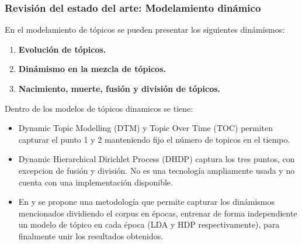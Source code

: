 \documentclass[
	spanish, %
	aspectratio=43, %
	hyperref={pdfencoding=auto,psdextra},
	xcolor={dvipsnames,table,usenames}
]{beamer}
\begin{document}
\begin{frame}
  
\frametitle{Revisión del estado del arte: Modelamiento dinámico}
En el modelamiento de tópicos se pueden presentar los siguientes dinámismos:

\begin{enumerate}
  \item \textbf{Evolución de tópicos.}
  \item \textbf{Dinámismo en la mezcla de tópicos.}
  \item \textbf{Nacimiento, muerte, fusión y división de tópicos.}
\end{enumerate}

Dentro de los modelos de tópicos dinamicos se tiene:
\begin{itemize}
  \item Dynamic Topic Modelling (DTM) y Topic Over Time (TOC)\cite{wang2006topics} permiten capturar el punto 1 y 2 manteniendo fijo el número de topicos en el tiempo.
  \item Dynamic Hierarchical Dirichlet Process (DHDP)\cite{ahmed2012timeline} captura los tres puntos, con excepcion de fusión y división. No es una tecnología ampliamente usada y no cuenta con una implementación disponible.\\
  \item En \cite{wilson2011tracking} y \cite{beykikhoshk2018discovering} se propone una metodología que permite capturar los dinámismos mencionados dividiendo el corpus en épocas, entrenar de forma independiente un modelo de tópico en cada época (LDA y HDP respectivamente), para finalmente unir los resultados obtenidos. 
\end{itemize}

%


\end{frame}
\end{document}
